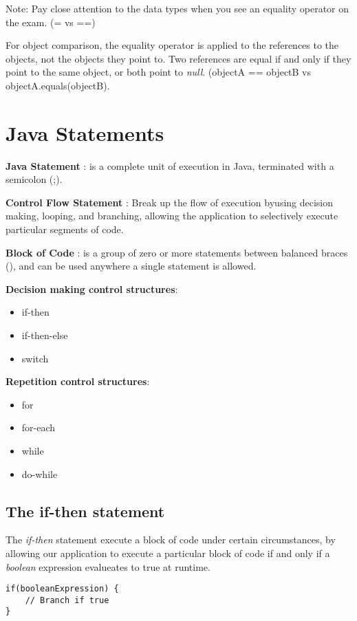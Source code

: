 \documentclass{article}
\begin{document}
Note: Pay close attention to the data types when you see an equality operator on the exam. (= vs ==)

For object comparison, the equality operator is applied to the references to the objects, not the objects they point to. Two references are equal if and only if they point to the same object, or both point to \emph{null}. (objectA == objectB vs objectA.equals(objectB).
\section{Java Statements}
\textbf{Java Statement} : is a complete unit of execution in Java, terminated with a semicolon (;).

\textbf{Control Flow Statement} : Break up the flow of execution byusing decision making, looping, and branching, allowing the application to selectively execute particular segments of code.

\textbf{Block of Code} : is a group of zero or more statements between balanced braces ({}), and can be used anywhere a single statement is allowed.

\textbf{Decision making control structures}:
\begin{itemize}
	\item if-then
	\item if-then-else
	\item switch
\end{itemize}

\textbf{Repetition control structures}:
\begin{itemize}
	\item for
	\item for-each
	\item while
	\item do-while
\end{itemize}


\subsection{The if-then statement}
The \emph{if-then} statement execute a block of code under certain circumstances, by allowing our application to execute a particular block of code if and only if a \emph{boolean} expression evalueates to true at runtime.

\begin{lstlisting}
if(booleanExpression) {
	// Branch if true
}

\end{lstlisting}
\end{document}
